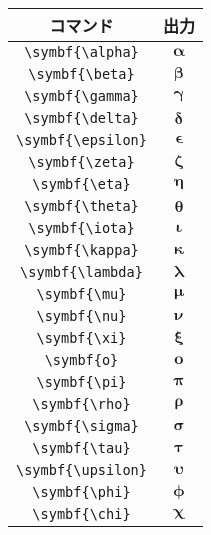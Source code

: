 \begin{table}[htbp]
    \centering
    \begin{subfigure}{.5\textwidth}
        \centering
        \begin{tabular}{cc}
            \toprule
            コマンド                & 出力                 \\
            \midrule
            \verb|\symbf{\alpha}|   & \(\symbf{\alpha}\)   \\
            \verb|\symbf{\beta}|    & \(\symbf{\beta}\)    \\
            \verb|\symbf{\gamma}|   & \(\symbf{\gamma}\)   \\
            \verb|\symbf{\delta}|   & \(\symbf{\delta}\)   \\
            \verb|\symbf{\epsilon}| & \(\symbf{\epsilon}\) \\
            \verb|\symbf{\zeta}|    & \(\symbf{\zeta}\)    \\
            \verb|\symbf{\eta}|     & \(\symbf{\eta}\)     \\
            \verb|\symbf{\theta}|   & \(\symbf{\theta}\)   \\
            \verb|\symbf{\iota}|    & \(\symbf{\iota}\)    \\
            \verb|\symbf{\kappa}|   & \(\symbf{\kappa}\)   \\
            \verb|\symbf{\lambda}|  & \(\symbf{\lambda}\)  \\
            \verb|\symbf{\mu}|      & \(\symbf{\mu}\)      \\
            \verb|\symbf{\nu}|      & \(\symbf{\nu}\)      \\
            \verb|\symbf{\xi}|      & \(\symbf{\xi}\)      \\
            \verb|\symbf{o}|        & \(\symbf{o}\)        \\
            \verb|\symbf{\pi}|      & \(\symbf{\pi}\)      \\
            \verb|\symbf{\rho}|     & \(\symbf{\rho}\)     \\
            \verb|\symbf{\sigma}|   & \(\symbf{\sigma}\)   \\
            \verb|\symbf{\tau}|     & \(\symbf{\tau}\)     \\
            \verb|\symbf{\upsilon}| & \(\symbf{\upsilon}\) \\
            \verb|\symbf{\phi}|     & \(\symbf{\phi}\)     \\
            \verb|\symbf{\chi}|     & \(\symbf{\chi}\)     \\

\end{tabular}
\end{subfigure}
\end{table}

